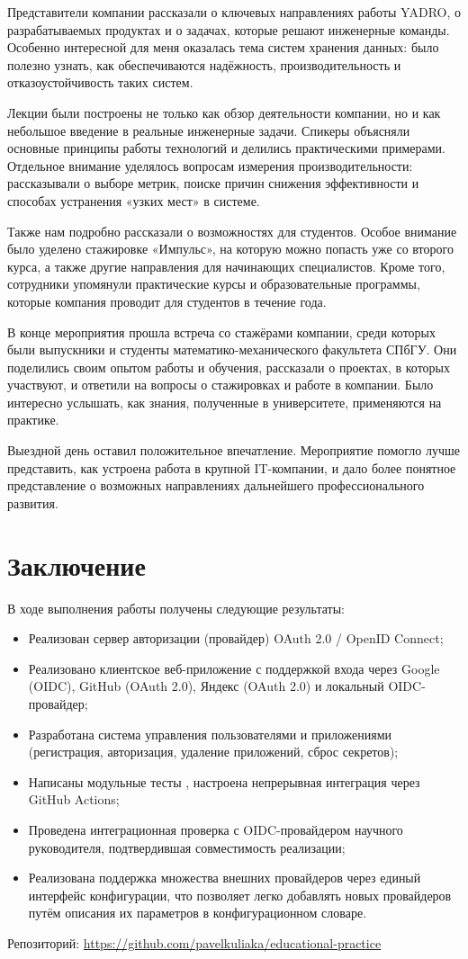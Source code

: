 \documentclass[a4paper]{article}
\begin{document}
Представители компании рассказали о ключевых направлениях работы YADRO, о разрабатываемых продуктах и о задачах, которые решают инженерные команды. Особенно интересной для меня оказалась тема систем хранения данных: было полезно узнать, как обеспечиваются надёжность, производительность и отказоустойчивость таких систем.

Лекции были построены не только как обзор деятельности компании, но и как небольшое введение в реальные инженерные задачи. Спикеры объясняли основные принципы работы технологий и делились практическими примерами. Отдельное внимание уделялось вопросам измерения производительности: рассказывали о выборе метрик, поиске причин снижения эффективности и способах устранения «узких мест» в системе.

Также нам подробно рассказали о возможностях для студентов. Особое внимание было уделено стажировке «Импульс», на которую можно попасть уже со второго курса, а также другие направления для начинающих специалистов. Кроме того, сотрудники упомянули практические курсы и образовательные программы, которые компания проводит для студентов в течение года.

В конце мероприятия прошла встреча со стажёрами компании, среди которых были выпускники и студенты математико-механического факультета СПбГУ. Они поделились своим опытом работы и обучения, рассказали о проектах, в которых участвуют, и ответили на вопросы о стажировках и работе в компании. Было интересно услышать, как знания, полученные в университете, применяются на практике.

Выездной день оставил положительное впечатление. Мероприятие помогло лучше представить, как устроена работа в крупной IT-компании, и дало более понятное представление о возможных направлениях дальнейшего профессионального развития.

\section{Заключение}

В ходе выполнения работы получены следующие результаты:

\begin{itemize}
    \item Реализован сервер авторизации (провайдер) OAuth 2.0 / OpenID Connect;
    \item Реализовано клиентское веб-приложение с поддержкой входа через Google (OIDC), GitHub (OAuth 2.0), Яндекс (OAuth 2.0) и локальный OIDC-провайдер;
    \item Разработана система управления пользователями и приложениями (регистрация, авторизация, удаление приложений, сброс секретов);
    \item Написаны модульные тесты , настроена непрерывная интеграция через GitHub Actions;
    \item Проведена интеграционная проверка с OIDC-провайдером научного руководителя, подтвердившая совместимость реализации;
    \item Реализована поддержка множества внешних провайдеров через единый интерфейс конфигурации, что позволяет легко добавлять новых провайдеров путём описания их параметров в конфигурационном словаре.
\end{itemize}

Репозиторий: \url{https://github.com/pavelkuliaka/educational-practice}
\end{document}
